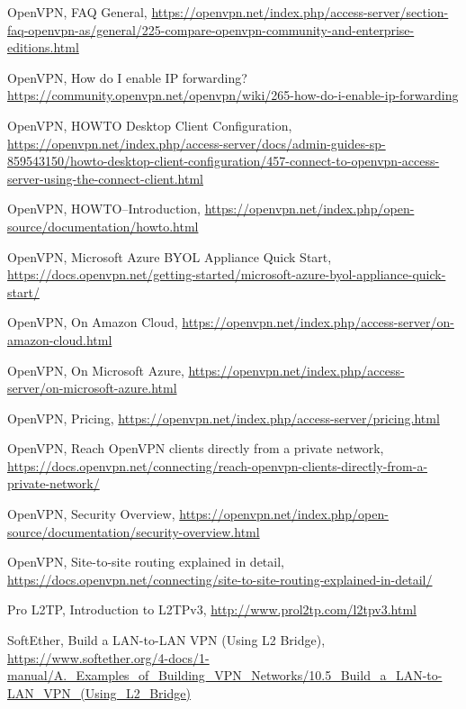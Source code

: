 \begin{thebibliography}{10}
  OpenVPN, FAQ General,
  \url{https://openvpn.net/index.php/access-server/section-faq-openvpn-as/general/225-compare-openvpn-community-and-enterprise-editions.html}

  OpenVPN, How do I enable IP forwarding?
  \url{https://community.openvpn.net/openvpn/wiki/265-how-do-i-enable-ip-forwarding}

  OpenVPN, HOWTO Desktop Client Configuration,
  \url{https://openvpn.net/index.php/access-server/docs/admin-guides-sp-859543150/howto-desktop-client-configuration/457-connect-to-openvpn-access-server-using-the-connect-client.html}

  OpenVPN, HOWTO--Introduction,
  \url{https://openvpn.net/index.php/open-source/documentation/howto.html}

  OpenVPN, Microsoft Azure BYOL Appliance Quick Start,
  \url{https://docs.openvpn.net/getting-started/microsoft-azure-byol-appliance-quick-start/}

  OpenVPN, On Amazon Cloud,
  \url{https://openvpn.net/index.php/access-server/on-amazon-cloud.html}

  OpenVPN, On Microsoft Azure,
  \url{https://openvpn.net/index.php/access-server/on-microsoft-azure.html}

  OpenVPN, Pricing,
  \url{https://openvpn.net/index.php/access-server/pricing.html}

  OpenVPN, Reach OpenVPN clients directly from a private network,
  \url{https://docs.openvpn.net/connecting/reach-openvpn-clients-directly-from-a-private-network/}

  OpenVPN, Security Overview,
  \url{https://openvpn.net/index.php/open-source/documentation/security-overview.html}

  OpenVPN, Site-to-site routing explained in detail,
  \url{https://docs.openvpn.net/connecting/site-to-site-routing-explained-in-detail/}

  Pro L2TP, Introduction to L2TPv3,
  \url{http://www.prol2tp.com/l2tpv3.html}

  SoftEther, Build a LAN-to-LAN VPN (Using L2 Bridge),
  \url{https://www.softether.org/4-docs/1-manual/A._Examples_of_Building_VPN_Networks/10.5_Build_a_LAN-to-LAN_VPN_(Using_L2_Bridge)}


\end{thebibliography}
